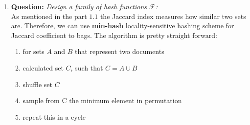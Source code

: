 \documentclass[11pt,a4paper,english]{article}
\begin{document}
\begin{enumerate}
\begin{enumerate}
          \item \textbf{Question:} \textit{Design a family of hash functions $\mathcal{F}$:}\\
            As mentioned in the part $1.1$ the Jaccard index measures how similar two sets are. Therefore, we can use \textbf{min-hash} locality-sensitive hashing scheme for Jaccard coefficient to bags. The algorithm is pretty straight forward:
            \begin{enumerate}
              \item for sets $A$ and $B$ that represent two documents
              \item calculated set $C$, such that $C = A \cup B $
              \item shuffle set $C$
              \item sample from C the minimum element in permutation
              \item repeat this in a cycle
            \end{enumerate}


\end{enumerate}
\end{enumerate}
\end{document}
